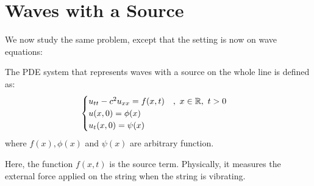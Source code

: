 \section{Waves with a Source}

We now study the same problem, except that the setting is now on wave equations:

\medskip 

\begin{defn} 
    The PDE system that represents waves with a source on the whole line is defined as:
    \[\begin{cases}
        u_{tt} - c^2u_{xx} = f(x,t)\quad ,\ x\in {\mathbb R},\ t>0\\
        u(x,0) = \phi(x)\\
        u_t(x,0) = \psi(x) 
    \end{cases}\]
    where $f(x),\phi(x)$ and $\psi(x)$ are arbitrary function. 
\end{defn}

Here, the function $f(x,t)$ is the source term. Physically, it measures the external force applied on the string when the string is vibrating.

\medskip 

